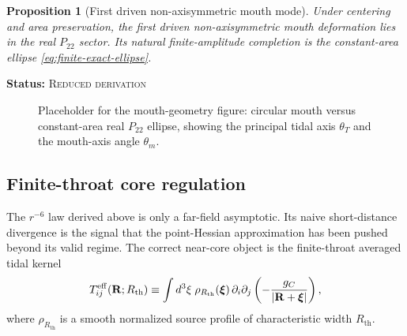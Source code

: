 \documentclass[11pt]{article}
\theoremstyle{plain}
\newtheorem{proposition}[theorem]{Proposition}
\theoremstyle{definition}
\theoremstyle{remark}
\newcommand{\statusReduced}{\textsc{Reduced derivation}}
\newcommand{\claimstatus}[1]{\par\smallskip\noindent\textbf{Status:} #1\par\smallskip}
\newcommand{\Ptwotwo}{P_{22}}
\newcommand{\Rth}{R_{\mathrm{th}}}
\newcommand{\thmouth}{\theta_m}
\begin{document}
\begin{proposition}[First driven non-axisymmetric mouth mode]\label{prop:finite-first-p22-mode}
Under centering and area preservation, the first driven non-axisymmetric mouth deformation lies in the real \(\Ptwotwo\) sector. Its natural finite-amplitude completion is the constant-area ellipse \cref{eq:finite-exact-ellipse}.
\end{proposition}
\claimstatus{\statusReduced}

\begin{figure}[t]
    \centering
    \fbox{\rule{0pt}{1.8in}\rule{0.92\linewidth}{0pt}}
    \caption{Placeholder for the mouth-geometry figure: circular mouth versus constant-area real \(\Ptwotwo\) ellipse, showing the principal tidal axis $\theta_T$ and the mouth-axis angle $\thmouth$.}
    \label{fig:finite-ellipse}
\end{figure}

\subsection{Finite-throat core regulation}\label{subsec:finite-core-regulation}

The $r^{-6}$ law derived above is only a far-field asymptotic. Its naive short-distance divergence is the signal that the point-Hessian approximation has been pushed beyond its valid regime. The correct near-core object is the finite-throat averaged tidal kernel
\begin{equation}
T_{ij}^{\rm eff}(\mathbf R;\Rth)
\equiv
\int d^3\xi\;\rho_{\Rth}(\boldsymbol\xi)\,
\partial_i\partial_j\left(-\frac{g_C}{|\mathbf R+\boldsymbol\xi|}\right),
\label{eq:finite-effective-tidal-kernel}
\end{equation}
where $\rho_{\Rth}$ is a smooth normalized source profile of characteristic width $\Rth$.
\end{document}
